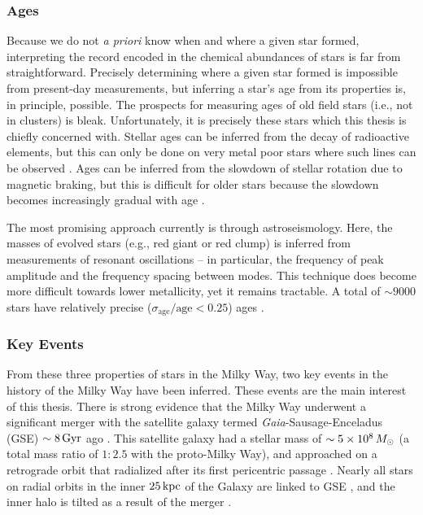 \subsubsection{Ages}
Because we do not \textit{a priori} know when and where a given star formed, interpreting the record encoded in the chemical abundances of stars is far from straightforward. Precisely determining where a given star formed is impossible from present-day measurements, but inferring a star's age from its properties is, in principle, possible. The prospects for measuring ages of old field stars (i.e., not in clusters) is bleak. Unfortunately, it is precisely these stars which this thesis is chiefly concerned with. Stellar ages can be inferred from the decay of radioactive elements, but this can only be done on very metal poor stars where such lines can be observed \citep[e.g.][]{2010A&A...509A..84L}. Ages can be inferred from the slowdown of stellar rotation due to magnetic braking, but this is difficult for older stars because the slowdown becomes increasingly gradual with age \citep[e.g.][]{2020AJ....160...90A}.

The most promising approach currently is through astroseismology. Here, the masses of evolved stars (e.g., red giant or red clump) is inferred from measurements of resonant oscillations -- in particular, the frequency of peak amplitude and the frequency spacing between modes. This technique does become more difficult towards lower metallicity, yet it remains tractable. A total of $\sim9000$ stars have relatively precise ($\sigma_{\textrm{age}}/\textrm{age} < 0.25$) ages \citep{2024arXiv241000102P}.

\subsubsection{Key Events}
From these three properties of stars in the Milky Way, two key events in the history of the Milky Way have been inferred. These events are the main interest of this thesis. There is strong evidence that the Milky Way underwent a significant merger with the satellite galaxy termed \textit{Gaia}-Sausage-Enceladus (GSE) $\sim8\,\textrm{Gyr}$ ago \citep{2018MNRAS.478..611B,2018Natur.563...85H}. This satellite galaxy had a stellar mass of $\sim5\times10^8\,M_{\odot}$ (a total mass ratio of $1:2.5$ with the proto-Milky Way), and approached on a retrograde orbit that radialized after its first pericentric passage \citep{2021ApJ...923...92N}. Nearly all stars on radial orbits in the inner $25\,\textrm{kpc}$ of the Galaxy are linked to GSE \citep{2020ApJ...901...48N}, and the inner halo is tilted as a result of the merger \citep{2022AJ....164..249H}.

